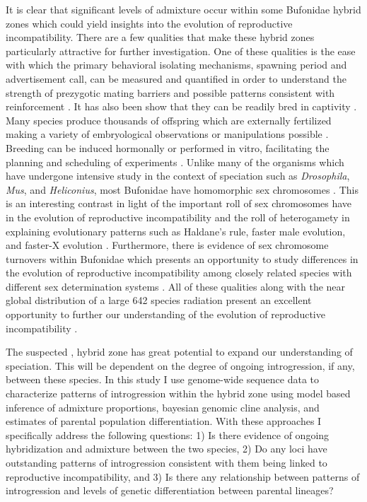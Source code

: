 It is clear that significant levels of admixture occur within some Bufonidae 
hybrid zones which could yield insights into the evolution of reproductive incompatibility. 
There are a few qualities that make these hybrid zones particularly attractive for further investigation.
One of these qualities is the ease with which the primary behavioral isolating mechanisms, 
spawning period and advertisement call, can be measured and quantified in order 
to understand the strength of prezygotic mating barriers and possible patterns 
consistent with reinforcement \parencite{cocroft1995,blair1974,kennedy1962}.
It has also been show that they can be readily bred in captivity \parencite{blair1972}. 
Many species produce thousands of offspring which are externally fertilized  
making a variety of embryological observations or manipulations possible \parencite{blair1972}.
Breeding can be induced hormonally or performed in vitro, facilitating the 
planning and scheduling of experiments \parencite{trudeau2010}.
Unlike many of the organisms which have undergone intensive study in the context 
of speciation such as \textit{Drosophila}, \textit{Mus}, and \textit{Heliconius},
most Bufonidae have homomorphic sex chromosomes \parencite{blair1972}. 
This is an interesting contrast in light of the important roll of sex chromosomes
have in the evolution of reproductive incompatibility and the roll of heterogamety
in explaining evolutionary patterns such as Haldane's rule, faster male evolution,
and faster-X evolution \parencite{delph2016}. 
Furthermore, there is evidence of sex chromosome turnovers within Bufonidae
which presents an opportunity to study differences in the evolution of  
reproductive incompatibility among closely related species with different 
sex determination systems \parencite{dufresnes2020,stock2011}. 
All of these qualities along with the near global distribution of a large 642 species  
radiation present an excellent opportunity to further our understanding of the 
evolution of reproductive incompatibility \parencite{amphibiaweb2023}.


The suspected \amer, \terr hybrid zone has great potential to expand our 
understanding of speciation. 
This will be dependent on the degree of ongoing introgression, if any, between 
these species.
In this study I use genome-wide sequence data to characterize patterns of  
introgression within the hybrid zone using model based inference of admixture
proportions, bayesian genomic cline analysis, and estimates of parental population differentiation.
With these approaches I specifically address the following questions: 
1) Is there evidence of ongoing hybridization and admixture between the two species,
2) Do any loci have outstanding patterns of introgression consistent with them
being linked to reproductive incompatibility, and
3) Is there any relationship between patterns of introgression and levels 
of genetic differentiation between parental lineages?



